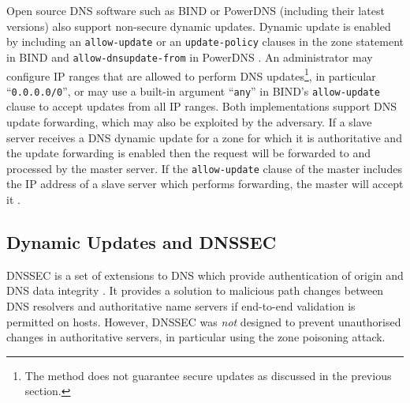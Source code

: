 Open source DNS software such as BIND or PowerDNS (including their latest versions) also support non-secure dynamic updates. 
Dynamic update is enabled by including an \texttt{allow-update} or an \texttt{update-policy} 
clauses in the zone statement in BIND \cite{bindman} and \texttt{allow-dnsupdate-from} in PowerDNS \cite{powerman}.
An administrator may configure IP ranges that are allowed to perform DNS updates\footnote{The method does not guarantee secure updates as discussed in the previous section.}, in particular ``\texttt{0.0.0.0/0}'', or may use a built-in argument ``\texttt{any}'' in BIND's \texttt{allow-update} clause  to accept updates from all IP ranges.
Both implementations support DNS update forwarding, which may also be exploited by the adversary.
If a slave server receives a DNS dynamic update for a zone for which it is authoritative and the update forwarding is enabled then the request will be forwarded to and processed by the master server.
If the \texttt{allow-update} clause of the master includes the IP address of a slave server which performs forwarding, the master will accept it \cite{bindman}.

\subsection{Dynamic Updates and DNSSEC}
DNSSEC is a set of extensions to DNS which provide %
authentication of origin and DNS data integrity \cite{rfc4033}.
It provides a solution to malicious path changes between DNS resolvers and authoritative name servers if end-to-end validation is permitted on hosts.
However, DNSSEC was \textit{not} designed to prevent unauthorised changes in authoritative  servers, in particular using the zone poisoning attack.

